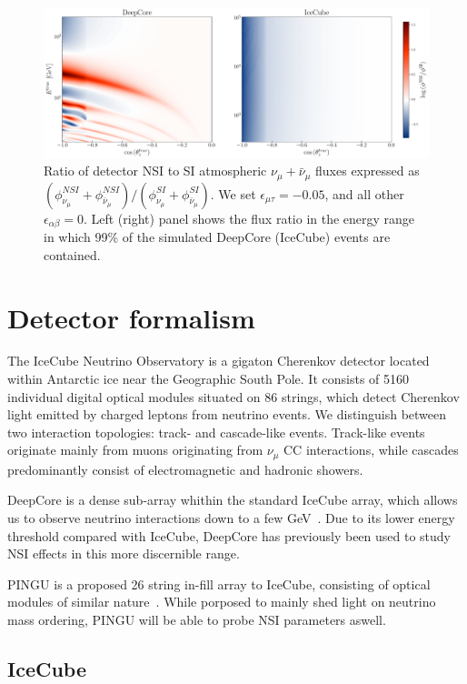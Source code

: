 \documentclass[draft=True]{revtex4-2}
\newcommand{\emt}{\ensuremath{\epsilon_{\mu\tau}}}
\newcommand{\nm}{\nu_\mu}
\begin{document}
\begin{figure}[!tb]
   \begin{center}
      \includegraphics[width=0.8\linewidth]{figures/flux_ratio.pdf}
   \end{center}
   \caption{Ratio of detector NSI to SI atmospheric $\nu_\mu + \bar{\nu}_\mu$ fluxes expressed as $(\phi_{\nu_\mu}^{NSI} + \phi_{\bar\nu_\mu}^{NSI})/(\phi_{\nu_\mu}^{SI} + \phi_{\bar\nu_\mu}^{SI})$.
   We set $\emt = -0.05$, and all other $\epsilon_{\alpha\beta}=0$. 
   Left (right) panel shows the flux ratio in the energy range in which 99\% of the simulated DeepCore (IceCube) events are contained.
   }\label{fig:flux_ratio}
\end{figure}%

\section{Detector formalism}
The IceCube Neutrino Observatory is a gigaton Cherenkov detector located within Antarctic ice near the Geographic 
South Pole. It consists of 5160 individual digital optical modules situated on 86 strings, which detect Cherenkov light emitted by charged leptons
from neutrino events. We distinguish between two interaction topologies: track- and cascade-like events. Track-like events originate mainly
from muons originating from $\nm$ CC interactions, while cascades predominantly consist of electromagnetic and hadronic showers. 

DeepCore is a dense sub-array whithin the standard IceCube array, which allows us to observe neutrino interactions down to a few GeV~\cite{DC2021}.
Due to its lower energy threshold compared with IceCube, DeepCore has previously been used to study NSI effects in this more discernible range\cite{DC2021,deepcoreNSI}.

PINGU is a proposed 26 string in-fill array to IceCube, consisting of optical modules of similar nature~\cite{PINGUletter}. While porposed to mainly shed light on 
neutrino mass ordering, PINGU will be able to probe NSI parameters aswell.  
\subsection{IceCube}\label{ch:ICmethod}
\end{document}
